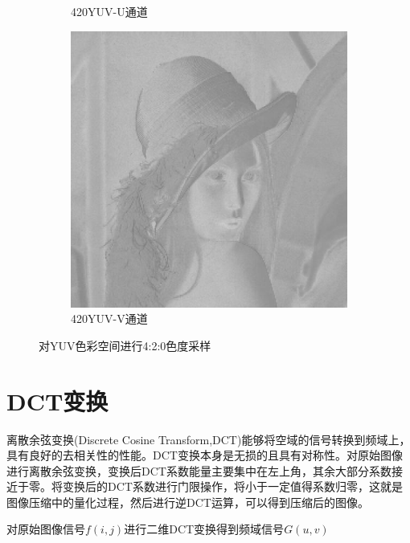 \begin{figure}[ht]
\begin{subfigure}{0.245\textwidth}
      \caption{420YUV-U通道}
      \label{Fig:RGB2YUV-u}
    \end{subfigure}
    \begin{subfigure}{0.245\textwidth}
      \includegraphics[width=\linewidth]{pages/jpeg/yuv420-v.jpg}
      \caption{420YUV-V通道}
      \label{Fig:RGB2YUV-v}
    \end{subfigure}

    \caption{对YUV色彩空间进行4:2:0色度采样}
    \label{Fig:RGB2YUV}
\end{figure}




\section{DCT变换}
离散余弦变换(Discrete Cosine Transform,DCT)能够将空域的信号转换到频域上，具有良好的去相关性的性能。DCT变换本身是无损的且具有对称性。对原始图像进行离散余弦变换，变换后DCT系数能量主要集中在左上角，其余大部分系数接近于零。将变换后的DCT系数进行门限操作，将小于一定值得系数归零，这就是图像压缩中的量化过程，然后进行逆DCT运算，可以得到压缩后的图像。

对原始图像信号$f(i,j)$进行二维DCT变换得到频域信号$G(u,v)$

